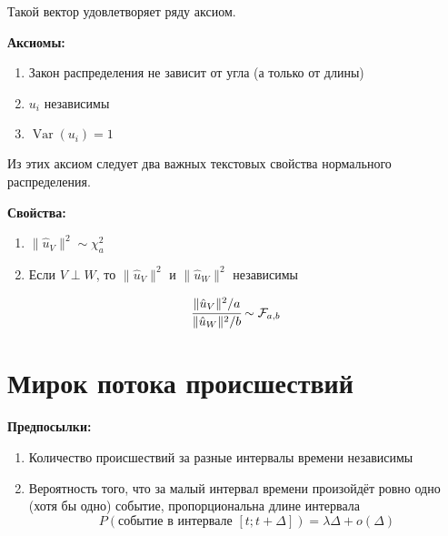 \documentclass[12pt]{article} %
\theoremstyle{definition} %
\DeclareMathOperator{\Var}{Var}
\def \hu{\hat{u}}
\def \cF{\mathcal{F}}
\def \cChi{\mathcal{\chi}}
\begin{document}
\begin{center}
\end{center}

    Такой вектор удовлетворяет ряду аксиом.
    \par
    \textbf{Аксиомы:}
    \begin{enumerate}
        \item Закон распределения не зависит от угла (а только от длины)
        \item $u_i$ независимы
        \item $\Var(u_i) = 1$
    \end{enumerate}
    Из этих аксиом следует два важных текстовых свойства нормального распределения.
    \par
    \textbf{Свойства:}
    \begin{enumerate}
    \item ${\lVert \hu_V \rVert ^2} \sim\cChi_{a}^2$
    \item Если $ V \perp W $, то $ {\lVert \hu_V \rVert ^2} $ и  $ {\lVert \hu_W \rVert ^2} $ независимы
    \end{enumerate}

    \[
        \cfrac{\lVert \hu_V \rVert ^2 / a}{\lVert \hu_W \rVert ^2 / b}  \sim \cF_{a,b}
    \]
\newpage
\section{Мирок потока происшествий}
    \textbf{Предпосылки:}
    \begin{enumerate}
        \item Количество происшествий за разные интервалы времени независимы
        \item Вероятность того, что за малый интервал времени произойдёт ровно одно (хотя бы одно) событие, пропорциональна длине интервала
        \[
             P(\text{событие в интервале } [t; t + \Delta]) = \lambda\Delta + o(\Delta)
        \]
    \end{enumerate}
\end{document}
